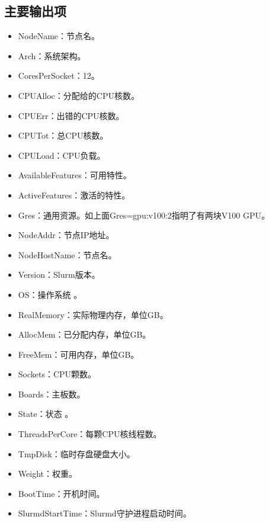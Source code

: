 \subsection{主要输出项}
\begin{itemize}
	\item NodeName：节点名。
	\item Arch：系统架构。
	\item CoresPerSocket：12。
	\item CPUAlloc：分配给的CPU核数。
	\item CPUErr：出错的CPU核数。
	\item CPUTot：总CPU核数。
	\item CPULoad：CPU负载。
	\item AvailableFeatures：可用特性。
	\item ActiveFeatures：激活的特性。
	\item Gres：通用资源。如上面Gres=gpu:v100:2指明了有两块V100 GPU。
	\item NodeAddr：节点IP地址。
	\item NodeHostName：节点名。
	\item Version：Slurm版本。
	\item OS：操作系统 。
	\item RealMemory：实际物理内存，单位GB。
	\item AllocMem：已分配内存，单位GB。
	\item FreeMem：可用内存，单位GB。
	\item Sockets：CPU颗数。
	\item Boards：主板数。
	\item State：状态 。
	\item ThreadsPerCore：每颗CPU核线程数。
	\item TmpDisk：临时存盘硬盘大小。
	\item Weight：权重。
	\item BootTime：开机时间。
	\item SlurmdStartTime：Slurmd守护进程启动时间。
\end{itemize}
